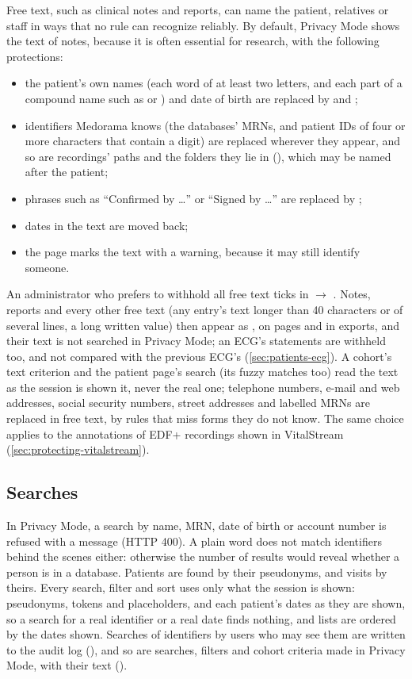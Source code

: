 Free text, such as clinical notes and reports, can name the patient, relatives or staff in ways
that no rule can recognize reliably. By default, Privacy Mode shows the text of notes, because it
is often essential for research, with the following protections:
\begin{itemize}
\item the patient's own names (each word of at least two letters, and each part of a compound
  name such as  or ) and date of birth are replaced by
   and ;
\item identifiers Medorama knows (the databases' MRNs, and patient IDs of four or more
  characters that contain a digit) are replaced wherever they appear, and so are recordings'
  paths and the folders they lie in (\code{[Folder]}), which may be named after the patient;
\item phrases such as ``Confirmed by \dots'' or ``Signed by \dots'' are replaced by
  ;
\item dates in the text are moved back;
\item the page marks the text with a warning, because it may still identify someone.
\end{itemize}
An administrator who prefers to withhold all free text ticks 
in  $\rightarrow$ . Notes, reports and every other free text (any
entry's text longer than 40 characters or of several lines, a long written value) then appear as
\code{[Withheld]}, on pages and in exports, and their text is not searched in Privacy Mode; an
ECG's statements are withheld too, and not compared with the previous ECG's
(\cref{sec:patients-ecg}). A
cohort's text criterion and the patient page's search (its fuzzy matches too) read the text as the
session is shown it, never the real one; telephone numbers, e-mail and web addresses, social
security numbers, street addresses and labelled MRNs are replaced in free text, by rules that
miss forms they do not know. The same choice applies to the annotations of EDF+
recordings shown in VitalStream (\cref{sec:protecting-vitalstream}).

\subsection{Searches}
\label{sec:protecting-searches}

In Privacy Mode, a search by name, MRN, date of birth or account number is refused with a
message (HTTP 400). A plain word does not match identifiers behind the scenes either: otherwise
the number of results would reveal whether a person is in a database. Patients are found by their
pseudonyms, and visits by theirs. Every search, filter and sort
uses only what the session is shown: pseudonyms, tokens and placeholders, and each patient's
dates as they are shown, so a search for a real identifier or a real date finds nothing, and
lists are ordered by the dates shown. Searches of identifiers by users who may see them are
written to the audit log (), and so are searches, filters and cohort criteria
made in Privacy Mode, with their text ().

